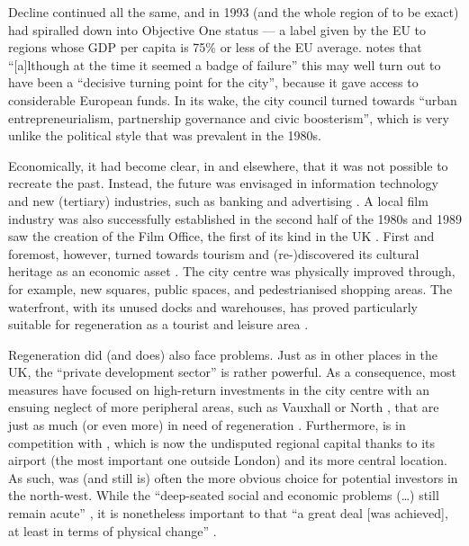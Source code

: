 Decline continued all the same, and in 1993  (and the whole region of  to be exact) had spiralled down into Objective One status --- a label given by the EU to regions whose GDP per capita is 75\% or less of the EU average.
\citet[53--54]{belchem2006a} notes that ``[a]lthough at the time it seemed a badge of failure'' this may well turn out to have been a ``decisive turning point for the city'', because it gave access to considerable European funds.
In its wake, the city council turned towards ``urban entrepreneurialism, partnership governance and civic boosterism'', which is very unlike the political style that was prevalent in the 1980s.

Economically, it had become clear, in  and elsewhere, that it was not possible to recreate the past.
Instead, the future was envisaged in information technology and new (tertiary) industries, such as banking and advertising \citep[cf.][32]{fraser2003}.
A local film industry was also successfully established in the second half of the 1980s and 1989 saw the creation of the  Film Office, the first of its kind in the UK \citep[cf.][479]{murden2006}.
First and foremost, however,  turned towards tourism and (re-)discovered its cultural heritage as an economic asset \citep[cf.][32--33]{fraser2003}.
The city centre was physically improved through, for example, new squares, public spaces, and pedestrianised shopping areas.
The waterfront, with its unused docks and warehouses, has proved particularly suitable for regeneration as a tourist and leisure area \citep[173--174]{couch2003a}.

Regeneration did (and does) also face problems.
Just as in other places in the UK, the ``private development sector'' is rather powerful.
As a consequence, most measures have focused on high-return investments in the city centre with an ensuing neglect of more peripheral areas, such as Vauxhall or North , that are just as much (or even more) in need of regeneration \citep[cf.][49]{couch2003}.
Furthermore,  is in competition with , which is now the undisputed regional capital thanks to its airport (the most important one outside London) and its more central location.
As such,  was (and still is) often the more obvious choice for potential investors in the north-west.
While the ``deep-seated social and economic problems (\ldots) still remain acute'' \citep[188]{fraser2003a}, it is nonetheless important to  that ``a great deal [was achieved], at least in terms of physical change'' \citep[44]{couch2003}.


